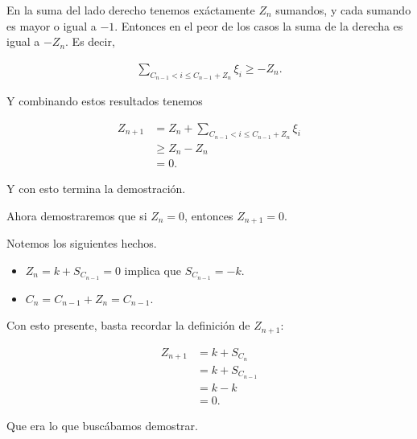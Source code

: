 \begin{itemize}
        En la suma del lado derecho tenemos exáctamente $Z_n$ sumandos, y cada sumando es mayor o igual a $-1$. Entonces
        en el peor de los casos la suma de la derecha es igual a $-Z_n$. Es decir, 
        
        \begin{align}
            \sum_{C_{n-1} < i \leq  C_{n-1} + Z_{n}} \xi_i \geq -Z_n.
        \end{align}
        
        Y combinando estos resultados tenemos
        
        \begin{align}
            Z_{n+1} &=      Z_n + \sum_{C_{n-1} < i \leq  C_{n-1} + Z_{n}} \xi_i    \\
                    &\geq   Z_n - Z_n                                               \\
                    &=      0.
        \end{align}
        
        Y con esto termina la demostración.
\end{itemize}

Ahora demostraremos que si $Z_n = 0$, entonces $Z_{n+1} = 0$.\par\null

Notemos los siguientes hechos. 
\begin{itemize}
	\item 
        $Z_n = k + S_{C_{n-1}} = 0$ implica que $S_{C_{n-1}} = -k$.
    
    \item
        $C_n = C_{n-1} + Z_n = C_{n-1}$.
\end{itemize}

Con esto presente, basta recordar la definición de $Z_{n+1}$:

\begin{align}
    Z_{n+1} &=  k   +   S_{C_n}         \\
            &=  k   +   S_{C_{n-1}}     \\
            &=  k   -   k               \\
            &=  0.
\end{align}

Que era lo que buscábamos demostrar.